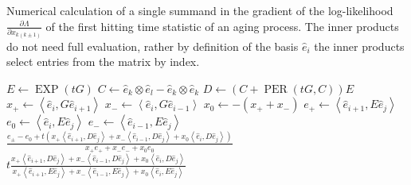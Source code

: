 \begin{algorithm}[!ht]
	\caption[Single summand of $\frac{\partial \Lambda}{\partial x_{k\left(k \pm 1\right)}}$]{Numerical calculation of a single summand in the gradient of the log-likelihood $\frac{\partial \Lambda}{\partial x_{k\left(k \pm 1\right)}}$ of the first hitting time statistic of an aging process. The inner products do not need full evaluation, rather by definition of the basis $\hat{e}_i$ the inner products select entries from the matrix by index.}
	\label{alg:singlesummand}
	\begin{algorithmic}[1]
				\State {}
			\EndIf
			\State $E \gets \operatorname{EXP}\left(t G\right)$
			\State $C \gets \hat{e}_k \otimes \hat{e}_l - \hat{e}_k \otimes \hat{e}_k$
			\State $D \gets \left(C + \operatorname{PER}\left(t G, C\right)\right)E$
			\State $x_{+} \gets \left\langle \hat{e}_i , G \hat{e}_{i+1} \right\rangle$
			\State $x_{-} \gets \left\langle \hat{e}_i , G \hat{e}_{i-1} \right\rangle$
			\State $x_0 \gets -\left(x_{+} + x_{-}\right)$
				\State $e_{+} \gets \left\langle \hat{e}_{i+1}, E \hat{e}_j \right\rangle$
				\State $e_0 \gets \left\langle \hat{e}_i, E \hat{e}_j \right\rangle$
				\State $e_{-} \gets \left\langle \hat{e}_{i-1}, E \hat{e}_j \right\rangle$
				\State \Return $\frac{e_\pm - e_0 + t \left(x_{+} \left\langle \hat{e}_{i+1}, D \hat{e}_j \right\rangle + x_{-} \left\langle \hat{e}_{i-1}, D \hat{e}_j \right\rangle + x_0 \left\langle \hat{e}_i, D \hat{e}_j \right\rangle\right)}{x_{+} e_{+} + x_{-}e_{-} + x_0 e_0}$
			\EndIf
			\State \Return $t \frac{ x_{+} \left\langle \hat{e}_{i+1}, D \hat{e}_j \right\rangle + x_{-} \left\langle \hat{e}_{i-1}, D \hat{e}_j \right\rangle + x_0 \left\langle \hat{e}_i, D \hat{e}_j \right\rangle}{x_{+} \left\langle \hat{e}_{i+1}, E \hat{e}_j \right\rangle + x_{-} \left\langle \hat{e}_{i-1}, E \hat{e}_j \right\rangle + x_0 \left\langle \hat{e}_i, E \hat{e}_j \right\rangle}$
		\EndFunction
	\end{algorithmic}
\end{algorithm}
